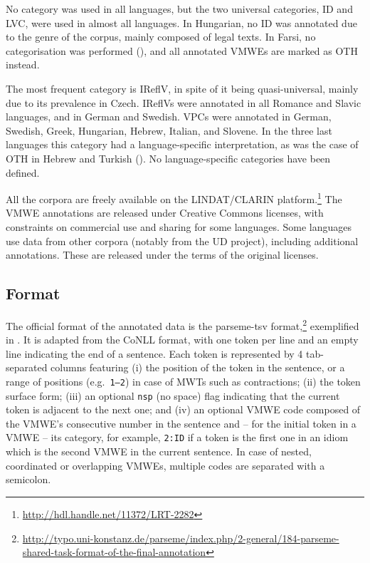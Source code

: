 \documentclass[output=paper,
modfonts,
]{langscibook}
\begin{document}
No category was used in all languages, but the two universal categories, ID and LVC, were used in almost all languages. In Hungarian, no ID was annotated due to the genre of the corpus, mainly composed of legal texts. In Farsi, no categorisation was performed (), and all annotated VMWEs are marked as OTH instead.

The most frequent category is IReflV, in spite of it being quasi-universal, mainly due to its prevalence in Czech. IReflVs were annotated in all Romance and Slavic languages, and in German and Swedish. VPCs were annotated in German, Swe\-dish, Greek, Hungarian, Hebrew, Italian, and Slovene. In the three last languages this category had a language-specific interpretation, as was the case of OTH in Hebrew and Turkish  (). No language-specific categories have been defined. 

All the corpora are freely available on the LINDAT/CLARIN platform.\footnote{\url{http://hdl.handle.net/11372/LRT-2282}} The VMWE annotations are released under Creative Commons licenses, with constraints on commercial use and sharing for some languages. Some languages use data from other corpora (notably from the UD project), including additional annotations. These are released under the terms of the original licenses.

\subsection{Format}
\label{sec:format}
%

The official format of the annotated data is the parseme-tsv format,\footnote{\url{http://typo.uni-konstanz.de/parseme/index.php/2-general/184-parseme-shared-task-format-of-the-final-annotation}} exemplified in . It is adapted from the CoNLL format, with one token per line and an empty line indicating the end of a sentence. Each token is represented by 4 tab-separated columns featuring (i) the position of the token in the sentence, or a range of positions (e.g.\ \texttt{1--2}) in case of MWTs such as contractions; (ii) the token surface form; (iii) an optional \texttt{nsp} (no space) flag indicating that the current token is adjacent to the next one; %
and (iv) an optional VMWE code composed of the VMWE's consecutive number in the sentence and -- for the initial token in a VMWE -- its category, for example, \texttt{2:ID} if a token is the first one in  an idiom which is the second VMWE in the current sentence. In case of nested, coordinated or overlapping VMWEs, multiple codes are separated with a semicolon.
\end{document}
